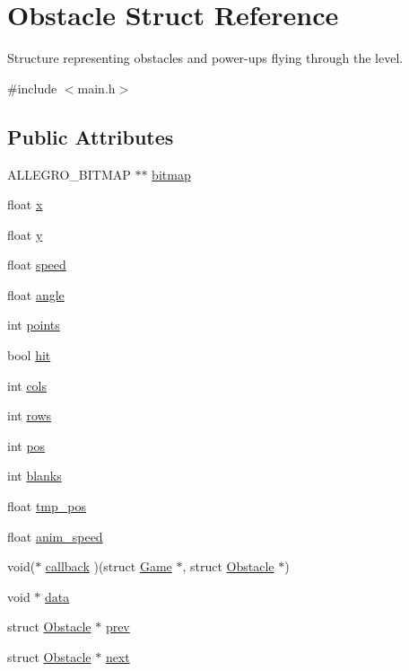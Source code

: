 \hypertarget{structObstacle}{\section{\-Obstacle \-Struct \-Reference}
\label{structObstacle}
}


\-Structure representing obstacles and power-\/ups flying through the level.  




{\ttfamily \#include $<$main.\-h$>$}

\subsection*{\-Public \-Attributes}
\begin{DoxyCompactItemize}
\item 
\-A\-L\-L\-E\-G\-R\-O\-\_\-\-B\-I\-T\-M\-A\-P $\ast$$\ast$ \hyperlink{structObstacle_a1f35f88fe8f6d0664da082f82ae4b774}{bitmap}
\item 
float \hyperlink{structObstacle_ad9cd25e0032f6692a4f93a057ccdfd85}{x}
\item 
float \hyperlink{structObstacle_af4b6f012014e2fa5aef193330f70fdef}{y}
\item 
float \hyperlink{structObstacle_a1e2b46db05325273ce0fcba3550b5b2a}{speed}
\item 
float \hyperlink{structObstacle_a99d85ef4e92f7e899b49ac85b2e1dbdc}{angle}
\item 
int \hyperlink{structObstacle_a38a164a0e4d6f6508fb65c6eff39147f}{points}
\item 
bool \hyperlink{structObstacle_ac89d025f4ad7c2f083d262c1bee4e851}{hit}
\item 
int \hyperlink{structObstacle_ad51aa07361c732a47e78c80fae2fab7c}{cols}
\item 
int \hyperlink{structObstacle_aab33c9d4c0f05d02fda4e77cff7d7e72}{rows}
\item 
int \hyperlink{structObstacle_a5228dff4dc773a66043e822fb4d6d00c}{pos}
\item 
int \hyperlink{structObstacle_a862f4038bd63057d91406720bb586a9c}{blanks}
\item 
float \hyperlink{structObstacle_afd620c4c3496cd6f84184dcda4ca7611}{tmp\-\_\-pos}
\item 
float \hyperlink{structObstacle_a96a13e4704e4643291989193a112366a}{anim\-\_\-speed}
\item 
void($\ast$ \hyperlink{structObstacle_a21b4ff0edaa2dc5394ff7a6328e48358}{callback} )(struct \hyperlink{structGame}{\-Game} $\ast$, struct \hyperlink{structObstacle}{\-Obstacle} $\ast$)
\item 
void $\ast$ \hyperlink{structObstacle_a88728e624cc62993e2bf52aff816cdff}{data}
\item 
struct \hyperlink{structObstacle}{\-Obstacle} $\ast$ \hyperlink{structObstacle_a13bc07b730f58d5b1c3db68e8e4aca27}{prev}
\item 
struct \hyperlink{structObstacle}{\-Obstacle} $\ast$ \hyperlink{structObstacle_aedbcf65351fa59ca9f18f6fba0287dc1}{next}
\end{DoxyCompactItemize}


